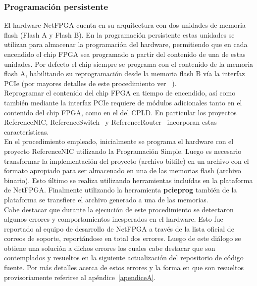 \subsubsection{Programaci\'on persistente}
El hardware NetFPGA cuenta en su arquitectura con dos unidades de memoria flash (Flash A y Flash B). En la programaci\'on persistente estas unidades se utilizan para almacenar la programaci\'on del hardware, permitiendo que en cada encendido el chip FPGA sea programado a partir del contenido de una de estas unidades. Por defecto el chip siempre se programa con el contenido de la memoria flash A, habilitando su reprogramaci\'on desde la memoria flash B v\'ia la interfaz PCIe (por mayores detalles de este procedimiento ver ~\citep{PCIEProgProject}).\\

Reprogramar el contenido del chip FPGA en tiempo de encendido, así como también mediante la interfaz PCIe requiere de módulos adicionales tanto en el contenido del chip FPGA, como en el del CPLD. En particular los proyectos ReferenceNIC\citep{ReferenceNICProject}, ReferenceSwitch~\citep{ReferenceSwitchProject} y ReferenceRouter~\citep{ReferenceRouterProject} incorporan estas características.\\

En el procedimiento empleado, inicialmente se programa el hardware con el proyecto ReferenceNIC utilizando la Programaci\'on Simple. Luego es necesario transformar la implementaci\'on del proyecto (archivo bitfile) en un archivo con el formato apropiado para ser almacenado en una de las memorias flash (archivo binario). Esto \'ultimo se realiza utilizando herramientas inclu\'idas en la plataforma de NetFPGA. Finalmente utilizando la herramienta \textbf{pcieprog} también de la plataforma se transfiere el archivo generado a una de las memorias.\\

Cabe destacar que durante la ejecuci\'on de este procedimiento se detectaron algunos errores y comportamientos inesperados en el hardware. Esto fue reportado al equipo de desarrollo de NetFPGA a través de la lista oficial de correos de soporte, reportándose en total dos errores. Luego de este di\'alogo se obtiene una soluci\'on a dichos errores los cuales cabe destacar que son contemplados y resueltos en la siguiente actualizaci\'on del repositorio de c\'odigo fuente. Por m\'as detalles acerca de estos errores y la forma en que son resueltos provisoriamente referirse al ap\'endice~\ref{apendiceA}.\\

